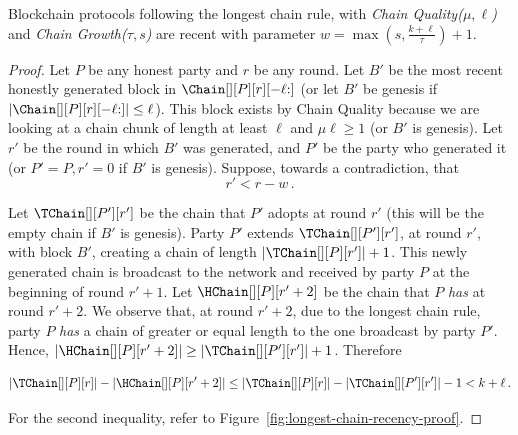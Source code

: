 \begin{lemma}\label{lem.longest-chain-recency}
  Blockchain protocols following the longest chain rule,
  with \emph{Chain Quality($\mu,\ell$)} and
  \emph{Chain Growth($\tau, s$)}
  are recent with parameter $w = \max(s, \frac{k + \ell}{\tau}) + 1$.
\end{lemma}
\begin{proof}
  Let $P$ be any honest party and $r$ be any round.
  Let $B'$ be the most recent honestly generated block
  in $\Chain[][P][r][{-\ell}{:}]$
  (or let $B'$ be genesis if $|\Chain[][P][r][{-\ell}{:}]| \leq \ell$).
  This block exists by
  Chain Quality because we are looking at a chain chunk of length at least $\ell$ and
  $\mu\ell \geq 1$ (or $B'$ is genesis).
  Let $r'$ be the round in which $B'$ was generated, and
  $P'$ be the party who generated it
  (or $P' = P, r' = 0$ if $B'$ is genesis).
  Suppose, towards a contradiction, that
  \begin{equation}
    r' < r - w\,.\label{eq:bitcoin-r-bound}
  \end{equation}

  Let $\TChain[][P'][r']$ be the chain that $P'$ adopts at
  round $r'$ (this will be the empty chain if $B'$ is genesis).
  Party $P'$ extends $\TChain[][P'][r']$, at round $r'$, with block $B'$,
  creating a chain of length $|\TChain[][P][r']| + 1$.
  This newly generated chain is broadcast to the network and
  received by party $P$ at the beginning of round $r' + 1$.
  Let $\HChain[][P][r' + 2]$ be the chain
  that $P$ \emph{has} at round $r' + 2$.
  We observe that, at round $r' + 2$, due to the
  longest chain rule, party $P$ \emph{has} a chain of greater or equal
  length to the one broadcast by party $P'$. Hence,
  $|\HChain[][P][r' + 2]| \geq |\TChain[][P'][r']| + 1$. Therefore

  \begin{equation}
    |\TChain[][P][r]| - |\HChain[][P][r' + 2]| \leq
     |\TChain[][P][r]| - |\TChain[][P'][r']| - 1 <
     k + \ell\,. \label{eq:bitcoin-contradiction}
  \end{equation}

  For the second inequality, refer to Figure~\ref{fig:longest-chain-recency-proof}.


\end{proof}

